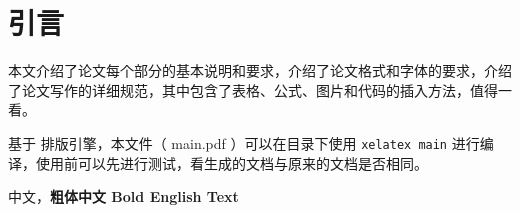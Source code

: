\chapter{引言}
\label{chap:references}
本文介绍了论文每个部分的基本说明和要求，介绍了论文格式和字体的要求，介绍了论文写作的详细规范，其中包含了表格、公式、图片和代码的插入方法，值得一看。

基于 \LaTeXe 排版引擎，本文件（ main.pdf ）可以在目录下使用 \lstinline|xelatex main| 进行编译，使用前可以先进行测试，看生成的文档与原来的文档是否相同。

中文，{\bfseries 粗体中文 Bold English Text}